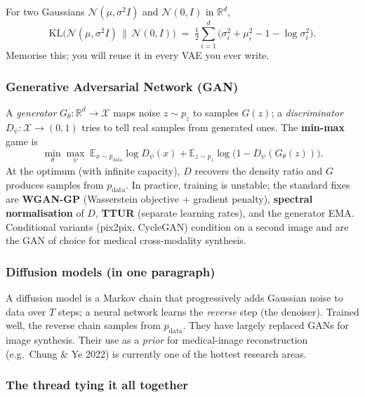 \documentclass[11pt,a4paper]{article}
\newcommand{\E}{\mathbb{E}}
\newcommand{\R}{\mathbb{R}}
\newcommand{\KL}{\mathrm{KL}}
\begin{document}
For two Gaussians $\mathcal{N}(\mu,\sigma^2 I)$ and
$\mathcal{N}(0,I)$ in $\R^d$,
\begin{equation}
  \KL\!\big(\mathcal{N}(\mu,\sigma^2 I) \,\|\, \mathcal{N}(0,I)\big) \;=\; \tfrac{1}{2}\sum_{i=1}^d \big( \sigma_i^2 + \mu_i^2 - 1 - \log\sigma_i^2 \big).
\end{equation}
Memorise this; you will reuse it in every VAE you ever write.

\subsubsection{Generative Adversarial Network (GAN)}

A \emph{generator} $G_\theta : \R^d \to \mathcal{X}$ maps noise
$z \sim p_z$ to samples $G(z)$; a
\emph{discriminator} $D_\psi : \mathcal{X} \to (0,1)$ tries to
tell real samples from generated ones. The \textbf{min-max} game is
\begin{equation}
  \min_\theta \max_\psi \; \E_{x \sim p_\text{data}}\log D_\psi(x) + \E_{z \sim p_z} \log\!\big(1 - D_\psi(G_\theta(z))\big).
\end{equation}
At the optimum (with infinite capacity), $D$ recovers the
density ratio and $G$ produces samples from $p_\text{data}$. In
practice, training is unstable; the standard fixes are
\textbf{WGAN-GP} (Wasserstein objective + gradient penalty),
\textbf{spectral normalisation} of $D$, \textbf{TTUR}
(separate learning rates), and the generator EMA. Conditional
variants (pix2pix, CycleGAN) condition on a second image and are the
GAN of choice for medical cross-modality synthesis.

\subsubsection{Diffusion models (in one paragraph)}

A diffusion model is a Markov chain that progressively adds
Gaussian noise to data over $T$ steps; a neural network learns the
\emph{reverse} step (the denoiser). Trained well, the reverse chain
samples from $p_\text{data}$. They have largely replaced GANs for
image synthesis. Their use as a \emph{prior} for medical-image
reconstruction (e.g.\ Chung \& Ye 2022) is currently one of the
hottest research areas.

\subsubsection{The thread tying it all together}
\end{document}
